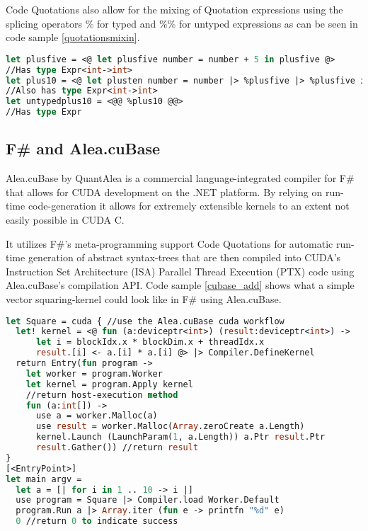 Code Quotations also allow for the mixing of Quotation expressions using the splicing operators $\%$ for typed and $\%\%$ for untyped expressions as can be seen in code sample \ref{quotationsmixin}.

\begin{lstlisting}[caption=Quotation mixing, label=quotationsmixin, language=ml]
let plusfive = <@ let plusfive number = number + 5 in plusfive @>
//Has type Expr<int->int>
let plus10 = <@ let plusten number = number |> %plusfive |> %plusfive in plusten @>
//Also has type Expr<int->int>
let untypedplus10 = <@@ %plus10 @@>
//Has type Expr
\end{lstlisting}


\subsection{F\# and Alea.cuBase}\label{subsec:background:fsharpcubase}
Alea.cuBase by QuantAlea\cite{quantalea} is a commercial language-integrated compiler for F\# that allows for CUDA development on the .NET platform.
By relying on run-time code-generation it allows for extremely extensible kernels to an extent not easily possible in CUDA C.

It utilizes F\#'s meta-programming support Code Quotations for automatic run-time generation of abstract syntax-trees that are then compiled into CUDA's Instruction Set Architecture (ISA) Parallel Thread Execution (PTX) code using Alea.cuBase's compilation API.
Code sample \ref{cubase_add} shows what a simple vector squaring-kernel could look like in F\# using Alea.cuBase.

\begin{lstlisting}[caption=Alea.cuBase square kernel, label=cubase_add, language=ml]
let Square = cuda { //use the Alea.cuBase cuda workflow
  let! kernel = <@ fun (a:deviceptr<int>) (result:deviceptr<int>) ->
      let i = blockIdx.x * blockDim.x + threadIdx.x
      result.[i] <- a.[i] * a.[i] @> |> Compiler.DefineKernel
  return Entry(fun program ->
    let worker = program.Worker
    let kernel = program.Apply kernel
    //return host-execution method
    fun (a:int[]) ->
      use a = worker.Malloc(a)
      use result = worker.Malloc(Array.zeroCreate a.Length)
      kernel.Launch (LaunchParam(1, a.Length)) a.Ptr result.Ptr
      result.Gather()) //return result
}
[<EntryPoint>]
let main argv = 
  let a = [| for i in 1 .. 10 -> i |]
  use program = Square |> Compiler.load Worker.Default
  program.Run a |> Array.iter (fun e -> printfn "%d" e)
  0 //return 0 to indicate success
\end{lstlisting}

